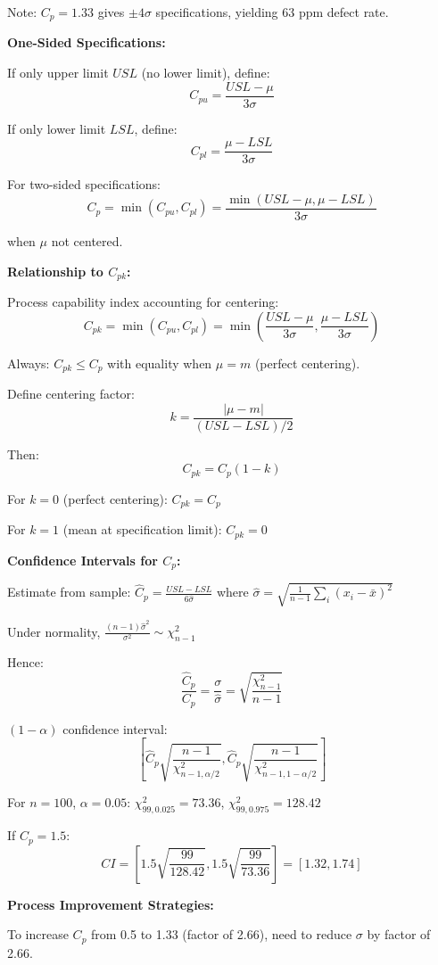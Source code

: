 \documentclass[12pt]{article}
\begin{document}
\begin{explanation}
Note: $C_p = 1.33$ gives $\pm 4\sigma$ specifications, yielding 63 ppm defect rate.

\textbf{One-Sided Specifications:}

If only upper limit $USL$ (no lower limit), define:
\[
C_{pu} = \frac{USL - \mu}{3\sigma}
\]

If only lower limit $LSL$, define:
\[
C_{pl} = \frac{\mu - LSL}{3\sigma}
\]

For two-sided specifications:
\[
C_p = \min(C_{pu}, C_{pl}) = \frac{\min(USL - \mu, \mu - LSL)}{3\sigma}
\]

when $\mu$ not centered.

\textbf{Relationship to $C_{pk}$:}

Process capability index accounting for centering:
\[
C_{pk} = \min\left(C_{pu}, C_{pl}\right) = \min\left(\frac{USL - \mu}{3\sigma}, \frac{\mu - LSL}{3\sigma}\right)
\]

Always: $C_{pk} \leq C_p$ with equality when $\mu = m$ (perfect centering).

Define centering factor:
\[
k = \frac{|\mu - m|}{(USL - LSL)/2}
\]

Then:
\[
C_{pk} = C_p(1 - k)
\]

For $k = 0$ (perfect centering): $C_{pk} = C_p$

For $k = 1$ (mean at specification limit): $C_{pk} = 0$

\textbf{Confidence Intervals for $C_p$:}

Estimate from sample: $\hat{C}_p = \frac{USL - LSL}{6\hat{\sigma}}$ where $\hat{\sigma} = \sqrt{\frac{1}{n-1}\sum_i(x_i - \bar{x})^2}$

Under normality, $\frac{(n-1)\hat{\sigma}^2}{\sigma^2} \sim \chi^2_{n-1}$

Hence:
\[
\frac{\hat{C}_p}{C_p} = \frac{\sigma}{\hat{\sigma}} = \sqrt{\frac{\chi^2_{n-1}}{n-1}}
\]

$(1-\alpha)$ confidence interval:
\[
\left[\hat{C}_p\sqrt{\frac{n-1}{\chi^2_{n-1,\alpha/2}}}, \hat{C}_p\sqrt{\frac{n-1}{\chi^2_{n-1,1-\alpha/2}}}\right]
\]

For $n = 100$, $\alpha = 0.05$: $\chi^2_{99,0.025} = 73.36$, $\chi^2_{99,0.975} = 128.42$

If $\hat{C}_p = 1.5$:
\[
CI = \left[1.5\sqrt{\frac{99}{128.42}}, 1.5\sqrt{\frac{99}{73.36}}\right] = [1.32, 1.74]
\]

\textbf{Process Improvement Strategies:}

To increase $C_p$ from 0.5 to 1.33 (factor of 2.66), need to reduce $\sigma$ by factor of 2.66.


\end{explanation}
\end{document}
